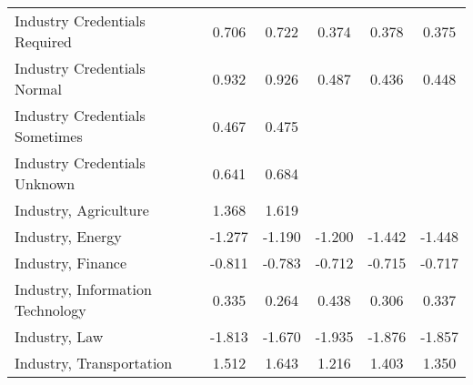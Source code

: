 {\begin{center}
{\begin{longtable}{l*{5}{c}}
            Industry Credentials Required    & 0.706\sym{*}          & 0.722\sym{**}         & 0.374                 & 0.378                 & 0.375                 \\
            \addlinespace
            Industry Credentials Normal      & 0.932\sym{**}         & 0.926\sym{**}         & 0.487\sym{*}          & 0.436\sym{*}          & 0.448\sym{*}          \\
            \addlinespace
            Industry Credentials Sometimes   & 0.467                 & 0.475                 &                       &                       &                       \\
            \addlinespace
            Industry Credentials Unknown     & 0.641\sym{*}          & 0.684\sym{**}         &                       &                       &                       \\

            \addlinespace
            Industry, Agriculture            & 1.368                 & 1.619\sym{*}          &                       &                       &                       \\
            \addlinespace
            Industry, Energy                 & -1.277\sym{*}         & -1.190\sym{*}         & -1.200\sym{*}         & -1.442\sym{**}        & -1.448\sym{**}        \\
            \addlinespace
            Industry, Finance                & -0.811\sym{***}       & -0.783\sym{***}       & -0.712\sym{***}       & -0.715\sym{***}       & -0.717\sym{***}       \\
            \addlinespace
            Industry, Information Technology & 0.335                 & 0.264                 & 0.438\sym{*}          & 0.306                 & 0.337                 \\
            \addlinespace
            Industry, Law                    & -1.813\sym{***}       & -1.670\sym{**}        & -1.935\sym{***}       & -1.876\sym{***}       & -1.857\sym{***}       \\
            \addlinespace
            Industry, Transportation         & 1.512\sym{*}          & 1.643\sym{**}         & 1.216                 & 1.403\sym{*}          & 1.350\sym{*}          \\


\end{longtable}}
\end{center}}
